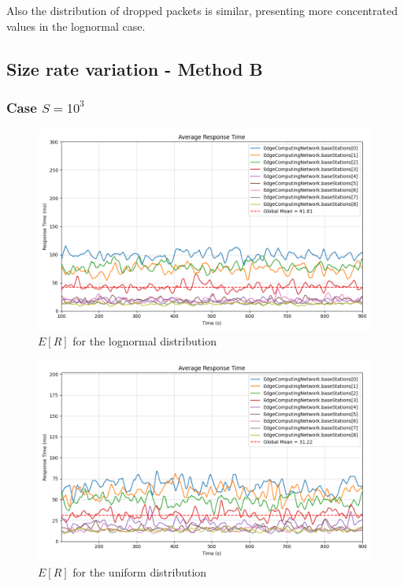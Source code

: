 \documentclass{report}
\begin{document}
Also the distribution of dropped packets is similar, presenting more concentrated values in the lognormal case.

\subsection{Size rate variation - Method B}
\subsubsection*{Case $S=10^3$}

\begin{figure}[H]
    \centering
    \includegraphics[width=\textwidth]{img/plots/log_1e3_B/resptime.png}
    \caption{$E[R]$ for the lognormal distribution}
\end{figure}

\begin{figure}[H]
    \centering
    \includegraphics[width=\textwidth]{img/plots/uni_1e3_B/resptime.png}
    \caption{$E[R]$ for the uniform distribution}
\end{figure}
\end{document}

